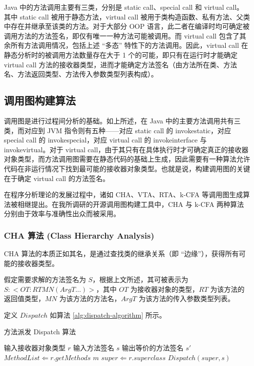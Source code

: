 Java 中的方法调用主要有三类，分别是 static call、special call 和 virtual call。其中 static call 被用于静态方法，virtual call 被用于类构造函数、私有方法、父类中存在并继承至该类的方法。对于大部分 OOP 语言，此二者在编译时均可确定被调用方法的方法签名，即仅有唯一一种方法可能被调用。而 virtual call 包含了其余所有方法调用情况，包括上述 “多态” 特性下的方法调用。因此，virtual call 在静态分析时的被调用方法数量存在大于 1 个的可能，即只有在运行时才能确定 virtual call 方法的接收器类型，进而才能确定方法签名（由方法所在类、方法名、方法返回类型、方法传入参数类型列表构成）\cite{10.1145/263700.264352}。

\subsection{调用图构建算法}

调用图是进行过程间分析的基础。如上所述，在 Java 中的主要方法调用共有三类，而对应到 JVM 指令则有五种——对应 static call 的 invokestatic，对应 special call 的 invokespecial，对应 virtual call 的 invokeinterface 与 invokevirtual。对于 virtual call，由于其只有在具体执行时才可确定真正的接收器对象类型，而方法调用图需要在静态代码的基础上生成，因此需要有一种算法允许代码在非运行情况下找到最可能的接收器对象类型。也就是说，构建调用图的关键在于确定 virtual call 的方法签名。

在程序分析理论的发展过程中，诸如 CHA、VTA、RTA、k-CFA 等调用图生成算法被相继提出。在我所调研的开源调用图构建工具中，CHA 与 k-CFA 两种算法分别由于效率与准确性出众而被采用。

\subsubsection{CHA 算法 (Class Hierarchy Analysis)}

CHA 算法的本质正如其名，是通过查找类的继承关系（即 “边缘”），获得所有可能的接收器类型。

假定需要求解的方法签名为 $S$，根据上文所述，其可被表示为 $S: <OT: RT MN(ArgT...)>$，其中 $OT$ 为接收器对象的类型，$RT$ 为该方法的返回值类型，$MN$ 为该方法的方法名，$ArgT$ 为该方法的传入参数类型列表。

定义 $Dispatch$ 如算法 \ref{alg:dispatch-algorithm} 所示。

\vskip 13.8pt
\renewcommand{\thealgorithm}{5}
    \begin{algorithm}
        \caption{方法派发 Dispatch 算法}
        \begin{algorithmic}[1]
            \Require 输入接收器对象类型 $r$
            \Require 输入方法签名 $s$
            \Ensure 输出等价的方法签名 $s'$
            \State $MethodList \Leftarrow r.getMethods$
                    \State \Return $m$
                \EndIf
            \EndFor
            \State $super \Leftarrow r.superclass$
            \State \Return $Dispatch(super, s)$
        \end{algorithmic}
        \label{alg:dispatch-algorithm}
    \end{algorithm}
    \vskip 13.8pt


